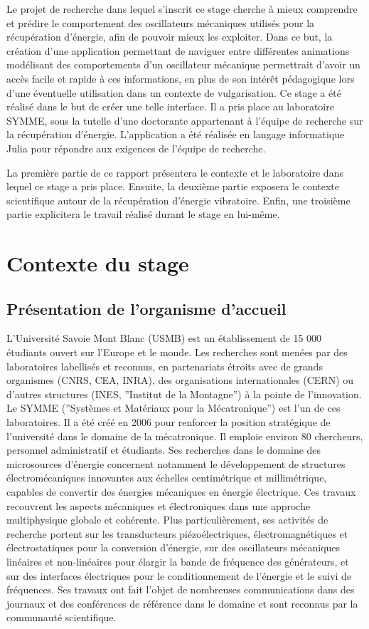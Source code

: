 \documentclass[a4paper, french, 12pt, titlepage]{article}
\begin{document}
Le projet de recherche dans lequel s'inscrit ce stage cherche à mieux comprendre et prédire le comportement des oscillateurs mécaniques utilisés pour la récupération d'énergie, afin de pouvoir mieux les exploiter.
Dans ce but, la création d'une application permettant de naviguer entre différentes animations modélisant des comportements d'un oscillateur mécanique permettrait d'avoir un accès facile et rapide à ces informations, en plus de son intérêt pédagogique lors d'une éventuelle utilisation dans un contexte de vulgarisation.
Ce stage a été réalisé dans le but de créer une telle interface.
Il a pris place au laboratoire SYMME, sous la tutelle d'une doctorante appartenant à l'équipe de recherche sur la récupération d'énergie.
L'application a été réalisée en langage informatique Julia pour répondre aux exigences de l'équipe de recherche.


La première partie de ce rapport présentera le contexte et le laboratoire dans lequel ce stage a pris place.
Ensuite, la deuxième partie exposera le contexte scientifique autour de la récupération d'énergie vibratoire.
Enfin, une troisième partie explicitera le travail réalisé durant le stage en lui-même.

\newpage

\section{Contexte du stage}

\subsection{Présentation de l'organisme d'accueil}

L'Université Savoie Mont Blanc (USMB) est un établissement de 15 000 étudiants ouvert sur l'Europe et le monde.
Les recherches sont menées par des laboratoires labellisés et reconnus, en partenariats étroits avec de grands organismes (CNRS, CEA, INRA), des organisations internationales (CERN) ou d'autres structures (INES, ”Institut de la Montagne”) à la pointe de l'innovation.
Le SYMME (”Systèmes et Matériaux pour la Mécatronique”) est l'un de ces laboratoires.
Il a été créé en 2006 pour renforcer la position stratégique de l'université dans le domaine de la mécatronique.
Il emploie environ 80 chercheurs, personnel administratif et étudiants.
Ses recherches dans le domaine des microsources d'énergie concernent notamment le développement de structures électromécaniques innovantes aux échelles centimétrique et millimétrique, capables de convertir des énergies mécaniques en énergie électrique.
Ces travaux recouvrent les aspects mécaniques et électroniques dans une approche multiphysique globale et cohérente.
Plus particulièrement, ses activités de recherche portent sur les transducteurs piézoélectriques, électromagnétiques et électrostatiques pour la conversion d'énergie, sur des oscillateurs mécaniques linéaires et non-linéaires pour élargir la bande de fréquence des générateurs, et sur des interfaces électriques pour le conditionnement de l'énergie et le suivi de fréquences.
Ses travaux ont fait l'objet de nombreuses communications dans des journaux et des conférences de référence dans le domaine et sont reconnus par la communauté scientifique.
\end{document}
